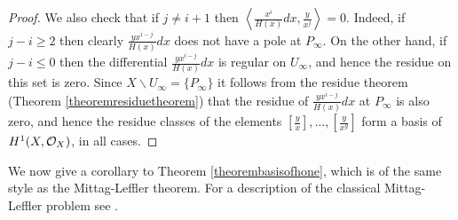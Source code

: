 \begin{proof}
    We also check that if $j \neq i+1$ then $\left \langle \frac{x^i}{H(x)}dx, \frac{y}{x^j} \right \rangle = 0$.
    Indeed, if $j-i \geq 2$ then clearly $\frac{yx^{i-j}}{H(x)}dx$ does not have a pole at $P_\infty$.
    On the other hand, if $j-i \leq 0$ then the differential $\frac{yx^{i-j}}{H(x)}dx$ is regular on $U_\infty$, and hence the residue on this set is zero.
    Since $X \backslash U_\infty = \{P_\infty\}$ it follows from the residue theorem (Theorem \ref{theoremresiduetheorem}) that the residue of $\frac{yx^{i-j}}{H(x)}dx$ at $P_\infty$ is also zero, and hence the residue classes of the elements $\left[\frac{y}{x}\right], \ldots, \left[\frac{y}{x^g}\right]$ form a basis of $H^1(X,\mathcal{O}_X)$, in all cases.
    \end{proof}


We now give a corollary to Theorem \ref{theorembasisofhone}, which is of the same style as the Mittag-Leffler theorem. For a description of the classical Mittag-Leffler problem see \cite[Pgs.\ 180-181]{miranda}.

